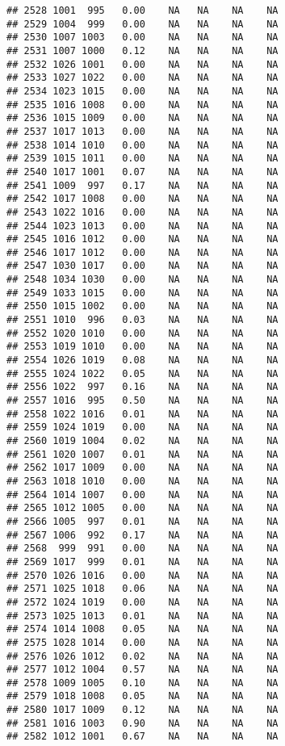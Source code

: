 \documentclass{article}\usepackage{graphicx, color}
\makeatletter
\newenvironment{kframe}{%
 \def\at@end@of@kframe{}%
 \ifinner\ifhmode%
  \def\at@end@of@kframe{\end{minipage}}%
  \begin{minipage}{\columnwidth}%
 \fi\fi%
 \def\FrameCommand##1{\hskip\@totalleftmargin \hskip-\fboxsep
 \colorbox{shadecolor}{##1}\hskip-\fboxsep
     \hskip-\linewidth \hskip-\@totalleftmargin \hskip\columnwidth}%
 \MakeFramed {\advance\hsize-\width
   \@totalleftmargin\z@ \linewidth\hsize
   \@setminipage}}%
 {\par\unskip\endMakeFramed%
 \at@end@of@kframe}
\newenvironment{knitrout}{}{} %
\makeatother
\begin{document}
\begin{knitrout}
\begin{kframe}
\begin{verbatim}
## 2528 1001  995   0.00    NA   NA    NA    NA
## 2529 1004  999   0.00    NA   NA    NA    NA
## 2530 1007 1003   0.00    NA   NA    NA    NA
## 2531 1007 1000   0.12    NA   NA    NA    NA
## 2532 1026 1001   0.00    NA   NA    NA    NA
## 2533 1027 1022   0.00    NA   NA    NA    NA
## 2534 1023 1015   0.00    NA   NA    NA    NA
## 2535 1016 1008   0.00    NA   NA    NA    NA
## 2536 1015 1009   0.00    NA   NA    NA    NA
## 2537 1017 1013   0.00    NA   NA    NA    NA
## 2538 1014 1010   0.00    NA   NA    NA    NA
## 2539 1015 1011   0.00    NA   NA    NA    NA
## 2540 1017 1001   0.07    NA   NA    NA    NA
## 2541 1009  997   0.17    NA   NA    NA    NA
## 2542 1017 1008   0.00    NA   NA    NA    NA
## 2543 1022 1016   0.00    NA   NA    NA    NA
## 2544 1023 1013   0.00    NA   NA    NA    NA
## 2545 1016 1012   0.00    NA   NA    NA    NA
## 2546 1017 1012   0.00    NA   NA    NA    NA
## 2547 1030 1017   0.00    NA   NA    NA    NA
## 2548 1034 1030   0.00    NA   NA    NA    NA
## 2549 1033 1015   0.00    NA   NA    NA    NA
## 2550 1015 1002   0.00    NA   NA    NA    NA
## 2551 1010  996   0.03    NA   NA    NA    NA
## 2552 1020 1010   0.00    NA   NA    NA    NA
## 2553 1019 1010   0.00    NA   NA    NA    NA
## 2554 1026 1019   0.08    NA   NA    NA    NA
## 2555 1024 1022   0.05    NA   NA    NA    NA
## 2556 1022  997   0.16    NA   NA    NA    NA
## 2557 1016  995   0.50    NA   NA    NA    NA
## 2558 1022 1016   0.01    NA   NA    NA    NA
## 2559 1024 1019   0.00    NA   NA    NA    NA
## 2560 1019 1004   0.02    NA   NA    NA    NA
## 2561 1020 1007   0.01    NA   NA    NA    NA
## 2562 1017 1009   0.00    NA   NA    NA    NA
## 2563 1018 1010   0.00    NA   NA    NA    NA
## 2564 1014 1007   0.00    NA   NA    NA    NA
## 2565 1012 1005   0.00    NA   NA    NA    NA
## 2566 1005  997   0.01    NA   NA    NA    NA
## 2567 1006  992   0.17    NA   NA    NA    NA
## 2568  999  991   0.00    NA   NA    NA    NA
## 2569 1017  999   0.01    NA   NA    NA    NA
## 2570 1026 1016   0.00    NA   NA    NA    NA
## 2571 1025 1018   0.06    NA   NA    NA    NA
## 2572 1024 1019   0.00    NA   NA    NA    NA
## 2573 1025 1013   0.01    NA   NA    NA    NA
## 2574 1014 1008   0.05    NA   NA    NA    NA
## 2575 1028 1014   0.00    NA   NA    NA    NA
## 2576 1026 1012   0.02    NA   NA    NA    NA
## 2577 1012 1004   0.57    NA   NA    NA    NA
## 2578 1009 1005   0.10    NA   NA    NA    NA
## 2579 1018 1008   0.05    NA   NA    NA    NA
## 2580 1017 1009   0.12    NA   NA    NA    NA
## 2581 1016 1003   0.90    NA   NA    NA    NA
## 2582 1012 1001   0.67    NA   NA    NA    NA

\end{verbatim}
\end{kframe}
\end{knitrout}
\end{document}
